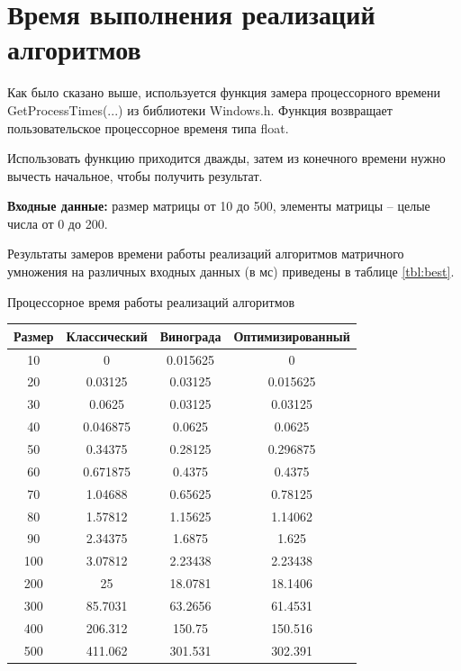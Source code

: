 \section{Время выполнения реализаций алгоритмов}

Как было сказано выше, используется функция замера процессорного времени GetProcessTimes(...) из библиотеки Windows.h. Функция возвращает пользовательское процессорное временя типа float.

Использовать функцию приходится дважды, затем из конечного времени нужно вычесть начальное, чтобы получить результат.

\textbf{Входные данные:} размер матрицы от 10 до 500, элементы матрицы -- целые числа от 0 до 200.

Результаты замеров времени работы реализаций алгоритмов матричного умножения на различных входных данных (в мс) приведены в таблице \ref{tbl:best}.


\begin{center}
	\begin{threeparttable}
		\caption{Процессорное время работы реализаций алгоритмов}
		\label{tbl:best}
		\begin{tabular}{|c|c|c|c|}
			\hline
			Размер & Классический &  Винограда &  Оптимизированный\\
			\hline
			10 & 0  &  0.015625 &0  \\ 
			\hline
			20 &0.03125  &      0.03125 &      0.015625\\ 
			\hline
			30 &  0.0625        &0.03125  &      0.03125 \\ 
			\hline
			40 &  0.046875     &    0.0625 &        0.0625  \\ 
			\hline
			50 & 0.34375      &  0.28125    &   0.296875  \\ 
			\hline
			60 & 0.671875    &     0.4375    &     0.4375 \\ 
			\hline
			70 &  1.04688   &     0.65625     &   0.78125 \\ 
			\hline
			80 & 1.57812   &     1.15625       & 1.14062 \\ 
			\hline
			90 & 2.34375  &       1.6875        &  1.625 \\ 
			\hline
			100 & 3.07812&        2.23438        &2.23438 \\ 
			\hline
			200 & 25 &       18.0781      &  18.1406\\ 
			\hline
			300 &  85.7031    &    63.2656 &       61.4531 \\ 
			\hline
			400 &  206.312   &      150.75  &      150.516  \\ 
			\hline
			500 &  411.062  &      301.531   &     302.391  \\ 
			\hline
		\end{tabular}
		
	\end{threeparttable}
\end{center}

